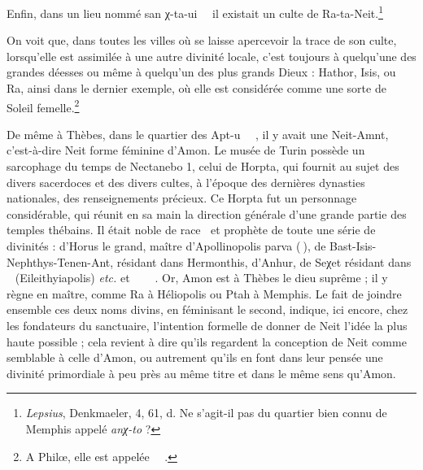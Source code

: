 \documentclass[a4paper, 11pt, oneside]{article}
\newcommand*\hieroAAAC{}
\newcommand*\hieroAAAH{}
\newcommand*\hieroAAAX{}
\newcommand*\hieroAAAZ{}
\newcommand*\hieroAABC{\raisebox{0.5ex}{}}
\newcommand*\hieroAACB{\raisebox{0.5ex}{}}
\newcommand*\hieroAACS{}
\newcommand*\hieroAAFD{}
\newcommand*\hieroAAFT{}
\newcommand*\hieroAAHY{}
\newcommand*\hieroAAII{}
\newcommand*\hieroAAIQ{}
\newcommand*\hieroAAJW{}
\newcommand*\hieroAALR{\raisebox{0.3ex}{}}
\newcommand*\hieroAARZ{}
\newcommand*\hieroAAVQ{}
\newcommand*\hieroAAXI{}
\newcommand*\hieroAAXJ{\raisebox{0.3ex}{}}
\newcommand*\hieroAAXK{}
\newcommand*\hieroAAXL{}
\newcommand*\hieroAAXM{}
\newcommand*\hieroAAXN{}
\newcommand*\hieroAAXO{}
\newcommand*\hieroAAXP{}
\newcommand*\hieroAAXQ{\raisebox{0.5ex}{}}
\newcommand*\hieroAAXR{}
\begin{document}
Enfin, dans un lieu nommé san χ-ta-ui $\hieroAACS\:\hieroAARZ\allowbreak\:\hieroAAVQ\:\hieroAAXI$ il existait un culte de Ra-ta-Neit.\footnote{\emph{Lepsius}, Denkmaeler, 4, 61, d. Ne s'agit-il pas du quartier bien connu de Memphis appelé \emph{anχ-to} ?}

On voit que, dans toutes les villes où se laisse apercevoir la trace de son culte, lorsqu'elle est assimilée à une autre divinité locale, c'est toujours à quelqu'une des grandes déesses ou même à quelqu'un des plus grands Dieux : Hathor, Isis, ou Ra, ainsi dans le dernier exemple, où elle est considérée comme une sorte de Soleil femelle.\footnote{A Philœ, elle est appelée $\hieroAAAZ\:\hieroAAXQ\:\hieroAAII\allowbreak\:\hieroAABC\:\hieroAAXR$.}

De même à Thèbes, dans le quartier des Apt-u $\hieroAAXJ\:\hieroAACB\:\hieroAAHY\allowbreak\:\hieroAAHY\:\hieroAAHY$, il y avait une Neit-Amnt, c'est-à-dire Neit forme féminine d'Amon. Le musée de Turin possède un sarcophage du temps de Nectanebo 1, celui de Horpta, qui fournit au sujet des divers sacerdoces et des divers cultes, à l'époque des dernières dynasties nationales, des renseignements précieux. Ce Horpta fut un personnage considérable, qui réunit en sa main la direction générale d'une grande partie des temples thébains. Il était noble de race $\hieroAAXK\:\hieroAAJW$ et prophète de toute une série de divinités : d'Horus le grand, maître d'Apollinopolis parva ($\hieroAAXL\:\hieroAAAC$), de Bast-Isis-Nephthys-Tenen-Ant, résidant dans Hermonthis, d'Anhur, de Seχet résidant dans $\hieroAAAX\:\hieroAAFD\:\hieroAAXM$ (Eileithyiapolis) \emph{etc.} et $\hieroAAXN\:\hieroAALR\:\hieroAAAH\allowbreak\:\hieroAAXO\:\hieroAAIQ\:\hieroAAAH\allowbreak\:\hieroAAXP\:\hieroAAHY\:\hieroAAFT$. Or, Amon est à Thèbes le dieu suprême ; il y règne en maître, comme Ra à Héliopolis ou Ptah à Memphis. Le fait de joindre ensemble ces deux noms divins, en féminisant le second, indique, ici encore, chez les fondateurs du sanctuaire, l'intention formelle de donner de Neit l'idée la plus haute possible ; cela revient à dire qu'ils regardent la conception de Neit comme semblable à celle d'Amon, ou autrement qu'ils en font dans leur pensée une divinité primordiale à peu près au même titre et dans le même sens qu'Amon.
\end{document}
